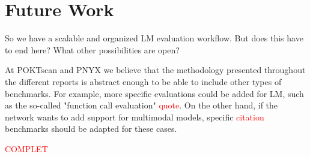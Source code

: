 \section{Future Work}\label{sec:z}

So we have a scalable and organized LM evaluation workflow. But does this have to end here? What other possibilities are open?

At POKTscan and PNYX we believe that the methodology presented throughout the different reports is abstract enough to be able to include other types of benchmarks. 
For example, more specific evaluations could be added for \gls{LM}, such as the so-called "function call evaluation" \textcolor{red}{quote}. 
On the other hand, if the network wants to add support for multimodal models, specific \textcolor{red}{citation} benchmarks should be adapted for these cases. 

\textcolor{red}{COMPLET}
